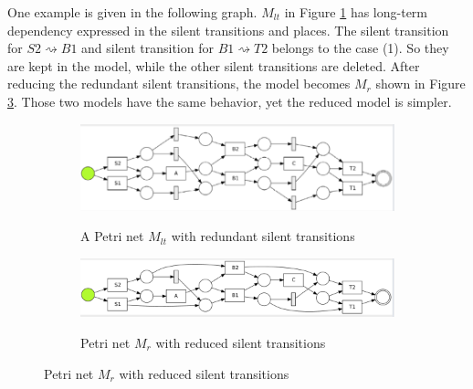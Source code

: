 One example is given in the following graph. $M_{lt}$ in Figure \ref{fig:with-lt} has long-term dependency expressed in the silent transitions and places. The silent transition for $S2 \rightsquigarrow B1 $ and silent transition for $B1 \rightsquigarrow T2$ belongs to the case (1). So they are kept in the model, while the other silent transitions are deleted. After reducing the redundant silent transitions, the model becomes $M_r$ shown in Figure \ref{fig:reduced-lt}. Those two models have the same behavior, yet the reduced model is simpler.
\begin{figure}[!h]
	\centering
	\begin{subfigure}[a]{\textwidth}
		\includegraphics[width=\textwidth]{figures/algorithm/dfg-IM-pn-with-lt.png}
		\label{fig:with-lt}
		\caption{A Petri net $M_{lt}$ with redundant silent transitions}
	\end{subfigure}
	\hfill
	\begin{subfigure}[b]{\textwidth}
		\centering
		\includegraphics[width=\linewidth]{figures/algorithm/dfg-IM-pn-with-lt-reduced.png}
		\label{fig:reduced-lt}
		\caption{Petri net $M_r$ with reduced silent transitions}
	\end{subfigure}
\end{figure}
